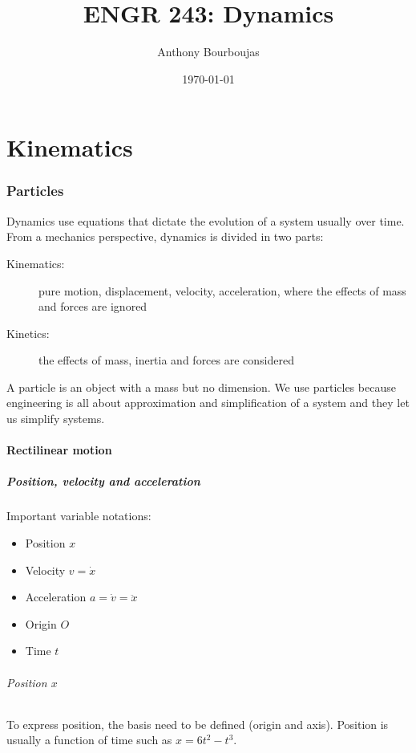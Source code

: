 \documentclass[10pt, twocolumn]{article}
\title{ENGR 243: Dynamics}
\date{\today}
\author{Anthony Bourboujas}
\begin{document}
\maketitle %

\part{Kinematics}
\section{Particles}
Dynamics use equations that dictate the evolution of a system usually over time.
From a mechanics perspective, dynamics is divided in two parts:
\begin{description}
  \item[Kinematics:] pure motion, displacement, velocity, acceleration, where the effects of mass and forces are ignored
  \item[Kinetics:] the effects of mass, inertia and forces are considered
\end{description}

A particle is an object with a mass but no dimension.
We use particles because engineering is all about approximation and simplification of a system and they let us simplify systems.


\subsection{Rectilinear motion}
\subsubsection{Position, velocity and acceleration}
Important variable notations:
\begin{itemize}
  \item Position \(x\)
  \item Velocity \(v = \dot{x}\)
  \item Acceleration \(a = \dot{v} = \ddot{x}\)
  \item Origin \(O\)
  \item Time \(t\)
\end{itemize}

\paragraph{Position \(x\)}
To express position, the basis need to be defined (origin and axis).
Position is usually a function of time such as \(x = 6t^2 - t^3\).
\end{document}
